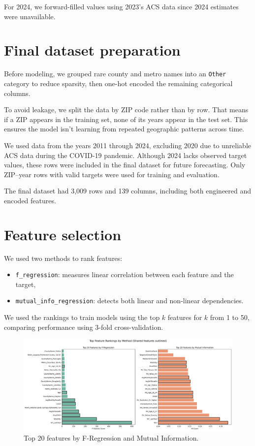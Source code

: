 For 2024, we forward-filled values using 2023’s ACS data since 2024 estimates were unavailable.

\section{Final dataset preparation}
Before modeling, we grouped rare county and metro names into an \texttt{Other} category to reduce sparsity, then one-hot encoded the remaining categorical columns.

To avoid leakage, we split the data by ZIP code rather than by row. That means if a ZIP appears in the training set, none of its years appear in the test set. This ensures the model isn’t learning from repeated geographic patterns across time.

We used data from the years 2011 through 2024, excluding 2020 due to unreliable ACS data during the COVID-19 pandemic. Although 2024 lacks observed target values, these rows were included in the final dataset for future forecasting. Only ZIP–year rows with valid targets were used for training and evaluation.

The final dataset had 3{,}009 rows and 139 columns, including both engineered and encoded features.

\section{Feature selection}
We used two methods to rank features:
\begin{itemize}
    \item \texttt{f\_regression}: measures linear correlation between each feature and the target,
    \item \texttt{mutual\_info\_regression}: detects both linear and non-linear dependencies.
\end{itemize}

We used the rankings to train models using the top $k$ features for $k$ from 1 to 50, comparing performance using 3-fold cross-validation.

\begin{figure}[!ht]
    \centering
    \includegraphics[width=\textwidth]{figures/topfeatures.png}
    \caption{Top 20 features by F-Regression and Mutual Information.}
    \label{fig:top_features}
\end{figure}
\FloatBarrier

